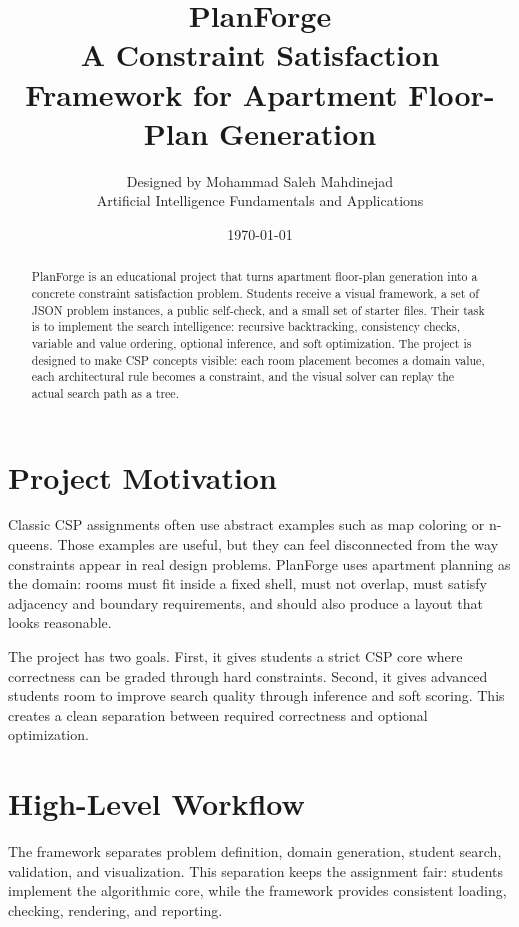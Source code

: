 \documentclass[11pt]{article}
\title{\textbf{PlanForge}\\A Constraint Satisfaction Framework for Apartment Floor-Plan Generation}
\author{Designed by Mohammad Saleh Mahdinejad\\Artificial Intelligence Fundamentals and Applications}
\date{\today}
\begin{document}
\maketitle

\begin{abstract}
PlanForge is an educational project that turns apartment floor-plan generation into a concrete
constraint satisfaction problem. Students receive a visual framework, a set of JSON problem
instances, a public self-check, and a small set of starter files. Their task is to implement the
search intelligence: recursive backtracking, consistency checks, variable and value ordering,
optional inference, and soft optimization. The project is designed to make CSP concepts visible:
each room placement becomes a domain value, each architectural rule becomes a constraint, and
the visual solver can replay the actual search path as a tree.
\end{abstract}

\tableofcontents
\newpage

\section{Project Motivation}

Classic CSP assignments often use abstract examples such as map coloring or n-queens. Those
examples are useful, but they can feel disconnected from the way constraints appear in real
design problems. PlanForge uses apartment planning as the domain: rooms must fit inside a
fixed shell, must not overlap, must satisfy adjacency and boundary requirements, and should
also produce a layout that looks reasonable.

The project has two goals. First, it gives students a strict CSP core where correctness can be
graded through hard constraints. Second, it gives advanced students room to improve search
quality through inference and soft scoring. This creates a clean separation between required
correctness and optional optimization.

\section{High-Level Workflow}

The framework separates problem definition, domain generation, student search, validation,
and visualization. This separation keeps the assignment fair: students implement the algorithmic
core, while the framework provides consistent loading, checking, rendering, and reporting.
\end{document}
